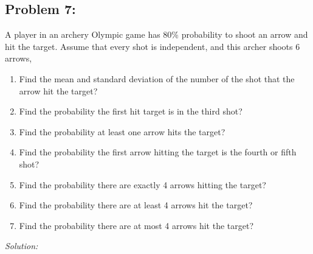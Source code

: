 \documentclass[a4paper]{article}
\begin{document}
\subsection*{Problem 7:}
A player in an archery Olympic game has 80\% probability to shoot an arrow and hit the target. Assume that every shot is independent, and this archer shoots 6 arrows,
\begin{enumerate}
	\item Find the mean and standard deviation of the number of the shot that the arrow hit the target?
	\item Find the probability the first hit target is in the third shot?
	\item Find the probability at least one arrow hits the target?
	\item Find the probability the first arrow hitting the target is the fourth or fifth shot?
	\item Find the probability there are exactly 4 arrows hitting the target?
	\item Find the probability there are at least 4 arrows hit the target?
	\item Find the probability there are at most 4 arrows hit the target?
\end{enumerate}
\textit{Solution:}\\
\end{document}
